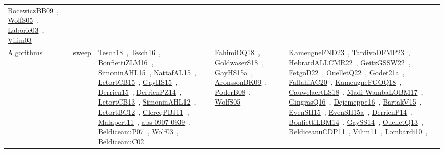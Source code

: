 {\begin{longtable}{lp{3cm}>{\raggedright\arraybackslash}p{6cm}>{\raggedright\arraybackslash}p{6cm}>{\raggedright\arraybackslash}p{8cm}}
\href{works/BocewiczBB09.pdf}{BocewiczBB09}~\cite{BocewiczBB09}, \href{works/WolfS05.pdf}{WolfS05}~\cite{WolfS05}, \href{works/Laborie03.pdf}{Laborie03}~\cite{Laborie03}, \href{works/Vilim03.pdf}{Vilim03}~\cite{Vilim03}\\
Algorithms & sweep & \href{works/Tesch18.pdf}{Tesch18}~\cite{Tesch18}, \href{works/Tesch16.pdf}{Tesch16}~\cite{Tesch16}, \href{works/BonfiettiZLM16.pdf}{BonfiettiZLM16}~\cite{BonfiettiZLM16}, \href{works/SimoninAHL15.pdf}{SimoninAHL15}~\cite{SimoninAHL15}, \href{works/NattafAL15.pdf}{NattafAL15}~\cite{NattafAL15}, \href{works/LetortCB15.pdf}{LetortCB15}~\cite{LetortCB15}, \href{works/GayHS15.pdf}{GayHS15}~\cite{GayHS15}, \href{works/Derrien15.pdf}{Derrien15}~\cite{Derrien15}, \href{works/DerrienPZ14.pdf}{DerrienPZ14}~\cite{DerrienPZ14}, \href{works/LetortCB13.pdf}{LetortCB13}~\cite{LetortCB13}, \href{works/SimoninAHL12.pdf}{SimoninAHL12}~\cite{SimoninAHL12}, \href{works/LetortBC12.pdf}{LetortBC12}~\cite{LetortBC12}, \href{works/ClercqPBJ11.pdf}{ClercqPBJ11}~\cite{ClercqPBJ11}, \href{works/Malapert11.pdf}{Malapert11}~\cite{Malapert11}, \href{works/abs-0907-0939.pdf}{abs-0907-0939}~\cite{abs-0907-0939}, \href{works/BeldiceanuP07.pdf}{BeldiceanuP07}~\cite{BeldiceanuP07}, \href{works/Wolf03.pdf}{Wolf03}~\cite{Wolf03}, \href{works/BeldiceanuC02.pdf}{BeldiceanuC02}~\cite{BeldiceanuC02} & \href{works/FahimiOQ18.pdf}{FahimiOQ18}~\cite{FahimiOQ18}, \href{works/GoldwaserS18.pdf}{GoldwaserS18}~\cite{GoldwaserS18}, \href{works/GayHS15a.pdf}{GayHS15a}~\cite{GayHS15a}, \href{works/AronssonBK09.pdf}{AronssonBK09}~\cite{AronssonBK09}, \href{works/PoderB08.pdf}{PoderB08}~\cite{PoderB08}, \href{works/WolfS05.pdf}{WolfS05}~\cite{WolfS05} & \href{works/KameugneFND23.pdf}{KameugneFND23}~\cite{KameugneFND23}, \href{works/TardivoDFMP23.pdf}{TardivoDFMP23}~\cite{TardivoDFMP23}, \href{works/HebrardALLCMR22.pdf}{HebrardALLCMR22}~\cite{HebrardALLCMR22}, \href{works/GeitzGSSW22.pdf}{GeitzGSSW22}~\cite{GeitzGSSW22}, \href{works/FetgoD22.pdf}{FetgoD22}~\cite{FetgoD22}, \href{works/OuelletQ22.pdf}{OuelletQ22}~\cite{OuelletQ22}, \href{works/Godet21a.pdf}{Godet21a}~\cite{Godet21a}, \href{works/FallahiAC20.pdf}{FallahiAC20}~\cite{FallahiAC20}, \href{works/KameugneFGOQ18.pdf}{KameugneFGOQ18}~\cite{KameugneFGOQ18}, \href{works/CauwelaertLS18.pdf}{CauwelaertLS18}~\cite{CauwelaertLS18}, \href{works/Madi-WambaLOBM17.pdf}{Madi-WambaLOBM17}~\cite{Madi-WambaLOBM17}, \href{works/GingrasQ16.pdf}{GingrasQ16}~\cite{GingrasQ16}, \href{works/Dejemeppe16.pdf}{Dejemeppe16}~\cite{Dejemeppe16}, \href{works/BartakV15.pdf}{BartakV15}~\cite{BartakV15}, \href{works/EvenSH15.pdf}{EvenSH15}~\cite{EvenSH15}, \href{works/EvenSH15a.pdf}{EvenSH15a}~\cite{EvenSH15a}, \href{works/DerrienP14.pdf}{DerrienP14}~\cite{DerrienP14}, \href{works/BonfiettiLBM14.pdf}{BonfiettiLBM14}~\cite{BonfiettiLBM14}, \href{works/GaySS14.pdf}{GaySS14}~\cite{GaySS14}, \href{works/OuelletQ13.pdf}{OuelletQ13}~\cite{OuelletQ13}, \href{works/BeldiceanuCDP11.pdf}{BeldiceanuCDP11}~\cite{BeldiceanuCDP11}, \href{works/Vilim11.pdf}{Vilim11}~\cite{Vilim11}, \href{works/Lombardi10.pdf}{Lombardi10}~\cite{Lombardi10}, 
\end{longtable}}
